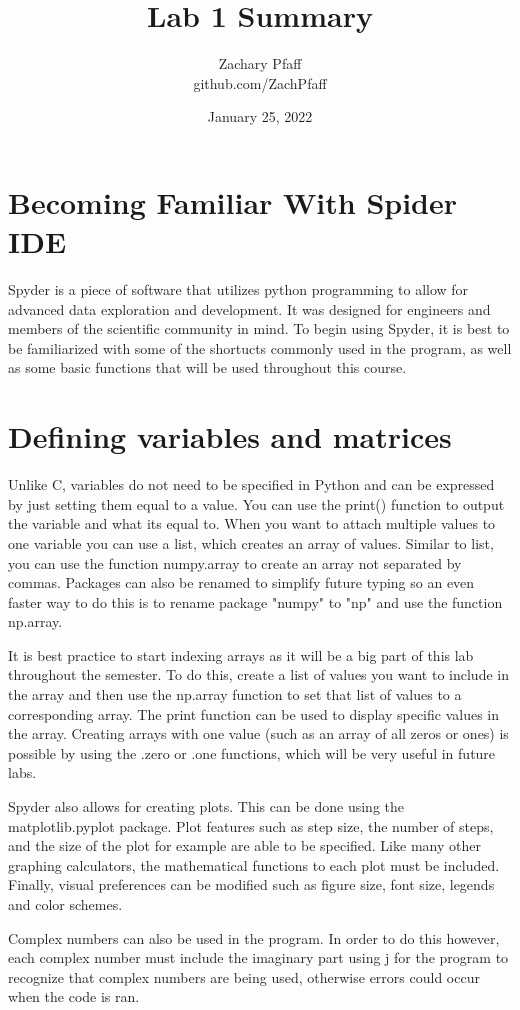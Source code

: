 \documentclass{article}
\title{Lab 1 Summary}
\author{Zachary Pfaff \\ github.com/ZachPfaff}
\date{January 25, 2022}
\begin{document}
\maketitle

\section{Becoming Familiar With Spider IDE}
\hspace{\parindent}Spyder is a piece of software that utilizes python programming to allow for advanced data exploration and development. It was designed for engineers and members of the scientific community in mind. To begin using Spyder, it is best to be familiarized with some of the shortucts commonly used in the program, as well as some basic functions that will be used throughout this course.

\section{Defining variables and matrices}
\hspace{\parindent}Unlike C, variables do not need to be specified in Python and can be expressed by just setting them equal to a value. You can use the print() function to output the variable and what its equal to. When you want to attach multiple values to one variable you can use a list, which creates an array of values. Similar to list, you can use the function numpy.array to create an array not separated by commas. Packages can also be renamed to simplify future typing so an even faster way to do this is to rename package "numpy" to "np" and use the function np.array.\par
\hspace{\parindent}It is best practice to start indexing arrays as it will be a big part of this lab throughout the semester. To do this, create a list of values you want to include in the array and then use the np.array function to set that list of values to a corresponding array. The print function can be used to display specific values in the array. Creating arrays with one value (such as an array of all zeros or ones) is possible by using the .zero or .one functions, which will be very useful in future labs.\par
\hspace{\parindent}Spyder also allows for creating plots. This can be done using the matplotlib.pyplot package. Plot features such as step size, the number of steps, and the size of the plot for example are able to be specified. Like many other graphing calculators, the mathematical functions to each plot must be included. Finally, visual preferences can be modified such as figure size, font size, legends and color schemes.\par 
\hspace{\parindent}Complex numbers can also be used in the program. In order to do this however, each complex number must include the imaginary part using j for the program to recognize that complex numbers are being used, otherwise errors could occur when the code is ran.\par
\end{document}
